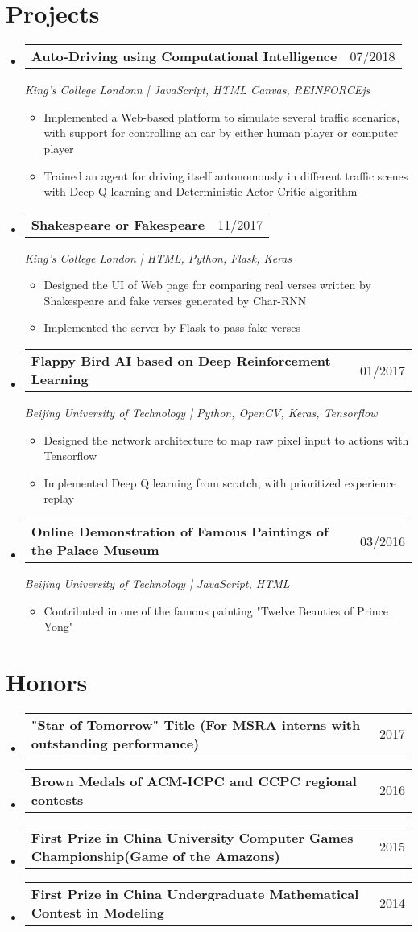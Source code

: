 \documentclass[a4paper,11pt]{article}
\makeatletter
\newcommand{\resumeItem}[1]{
  \item\small{#1 \vspace{-2pt}}
}
\newcommand{\resumeSubheading}[3]{
  \vspace{-1pt}\item
    \begin{tabular*}{0.97\textwidth}{l@{\extracolsep{\fill}}r}
      \textbf{#1} & #2
      \end{tabular*}
      \textit{\small#3}
}
\newcommand{\resumeMiniheading}[2]{
  \vspace{-1pt}\item
    \begin{tabular*}{0.97\textwidth}{l@{\extracolsep{\fill}}r}
      \textbf{#1} & #2
    \end{tabular*}
}
\newcommand{\resumeItemListStart}{\begin{itemize}[leftmargin=*, topsep=0ex]}
\newcommand{\resumeItemListEnd}{\end{itemize}}
\makeatother
\begin{document}
\section{Projects}
  \begin{itemize}[leftmargin=*, itemsep=5pt, label={}]
    \resumeSubheading{Auto-Driving using Computational Intelligence}{07/2018}{King's College Londonn \textnormal{|} JavaScript, HTML Canvas, REINFORCEjs}
      \resumeItemListStart
        \resumeItem {Implemented a Web-based platform to simulate several traffic scenarios, with support for controlling an car by either human player or computer player}
        \resumeItem {Trained an agent for driving itself autonomously in different traffic scenes with Deep Q learning and Deterministic Actor-Critic algorithm}
      \resumeItemListEnd
    
    \resumeSubheading{Shakespeare or Fakespeare}{11/2017}
    {King's College London \textnormal{|} HTML, Python, Flask, Keras}
      \resumeItemListStart
        \resumeItem {Designed the UI of Web page for comparing real verses written by Shakespeare and fake verses generated by Char-RNN}
        \resumeItem {Implemented the server by Flask to pass fake verses}
      \resumeItemListEnd

    \resumeSubheading{Flappy Bird AI based on Deep Reinforcement Learning}{01/2017}
    {Beijing University of Technology \textnormal{|} Python, OpenCV, Keras, Tensorflow}
        \resumeItemListStart
            \resumeItem {Designed the network architecture to map raw pixel input to actions with Tensorflow}
            \resumeItem {Implemented Deep Q learning from scratch, with prioritized experience replay}
        \resumeItemListEnd
  
    \resumeSubheading{Online Demonstration of Famous Paintings of the Palace Museum}{03/2016}{Beijing University of Technology \textnormal{|} JavaScript, HTML}
        \resumeItemListStart
          \resumeItem {Contributed in one of the famous painting "Twelve Beauties of Prince Yong"}
        \resumeItemListEnd
        
  \end{itemize}

\section{Honors}
  \begin{itemize}[leftmargin=*, itemsep=-1pt, label={}]
    \resumeMiniheading{"Star of Tomorrow" Title {\normalfont(For MSRA interns with outstanding performance)}}{2017}
    \resumeMiniheading{Brown Medals of ACM-ICPC and CCPC regional contests}{2016}
    \resumeMiniheading{First Prize in China University Computer Games Championship(Game of the Amazons)}{2015}
    \resumeMiniheading{First Prize in China Undergraduate Mathematical Contest in Modeling}{2014}
  \end{itemize}
\end{document}
